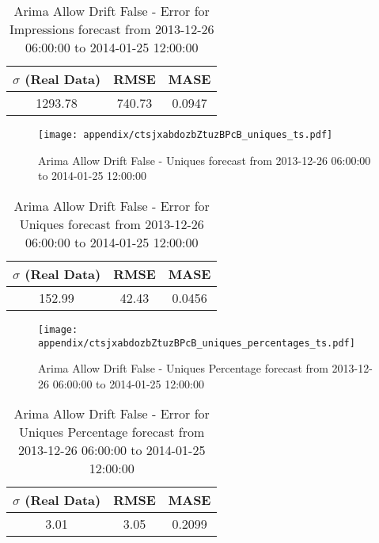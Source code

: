 \begin{table}[H]
\centering
\footnotesize
\begin{tabular}{ccc}
$\sigma$ (Real Data) & RMSE & MASE   \\ \hline
1293.78 & 740.73 & 0.0947 \\
\end{tabular}

\vspace{0.5cm}

\caption[]{
Arima Allow Drift False - Error for Impressions forecast from 2013-12-26 06:00:00 to 2014-01-25 12:00:00}
\end{table}

\begin{figure}[H] \begin{center} \leavevmode
\texttt{[image: appendix/ctsjxabdozbZtuzBPcB\_uniques\_ts.pdf]} \caption[]{
Arima Allow Drift False - Uniques forecast from 2013-12-26 06:00:00 to 2014-01-25 12:00:00} \label{fig:appendix/ctsjxabdozbZtuzBPcB_uniques_ts.pdf} \end{center}
\end{figure}

\begin{table}[H]
\centering
\footnotesize
\begin{tabular}{ccc}
$\sigma$ (Real Data) & RMSE & MASE   \\ \hline
152.99 & 42.43 & 0.0456 \\
\end{tabular}

\vspace{0.5cm}

\caption[]{
Arima Allow Drift False - Error for Uniques forecast from 2013-12-26 06:00:00 to 2014-01-25 12:00:00}
\end{table}

\begin{figure}[H] \begin{center} \leavevmode
\texttt{[image: appendix/ctsjxabdozbZtuzBPcB\_uniques\_percentages\_ts.pdf]} \caption[]{
Arima Allow Drift False - Uniques Percentage forecast from 2013-12-26 06:00:00 to 2014-01-25 12:00:00} \label{fig:appendix/ctsjxabdozbZtuzBPcB_uniques_percentages_ts.pdf} \end{center}
\end{figure}

\begin{table}[H]
\centering
\footnotesize
\begin{tabular}{ccc}
$\sigma$ (Real Data) & RMSE & MASE   \\ \hline
3.01 & 3.05 & 0.2099 \\
\end{tabular}

\vspace{0.5cm}

\caption[]{
Arima Allow Drift False - Error for Uniques Percentage forecast from 2013-12-26 06:00:00 to 2014-01-25 12:00:00}
\end{table}

